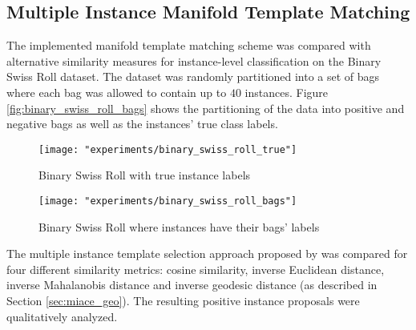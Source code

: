 \subsection{Multiple Instance Manifold Template Matching} \label{sec:forward_feature_selection}
The implemented manifold template matching scheme was compared with alternative similarity measures for instance-level classification on the Binary Swiss Roll dataset.  The dataset was randomly partitioned into a set of bags where each bag was allowed to contain up to $40$ instances.  Figure \ref{fig:binary_swiss_roll_bags} shows the partitioning of the data into positive and negative bags as well as the instances' true class labels.  

\begin{figure*}[h!]
	\begin{subfigure}[t]{0.5\textwidth}
	    \hspace{-1cm}
		\texttt{[image: "experiments/binary\_swiss\_roll\_true"]}
		\caption{Binary Swiss Roll with true instance labels}
	\end{subfigure}%
	\hfill
	\begin{subfigure}[t]{0.5\textwidth}
		\texttt{[image: "experiments/binary\_swiss\_roll\_bags"]}
		\caption{Binary Swiss Roll where instances have their bags' labels}
	\end{subfigure}
	
	\caption[Binary Swiss Roll bags]{a.) Binary Swiss Roll where instances are colored by their corresponding true label.  Red denotes the target class while blue represents the background class. b.) Binary Swiss Roll where instances are colored by the label of the bag the are in.  Blue denotes the instances in negative bags, while magenta shows the instances in positive bags.}
	\label{fig:binary_swiss_roll_bags}%
\end{figure*}

\noindent
The multiple instance template selection approach proposed by \citet{Zare2016MIACE} was compared for four different similarity metrics: cosine similarity, inverse Euclidean distance, inverse Mahalanobis distance and inverse geodesic distance (as described in Section \ref{sec:miace_geo}).  The resulting positive instance proposals were qualitatively analyzed.

